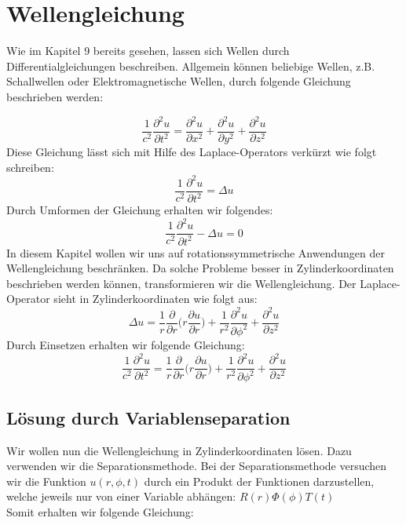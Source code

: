 \section{Wellengleichung}


Wie im Kapitel 9 bereits gesehen, lassen sich Wellen durch Differentialgleichungen beschreiben. Allgemein können beliebige Wellen, z.B. Schallwellen oder Elektromagnetische Wellen, durch folgende Gleichung beschrieben werden:

\begin{equation}
\frac{1}{c^2} \frac{\partial^2 u}{\partial t^2} = \frac{\partial^2 u}{\partial x^2} + \frac{\partial^2 u}{\partial y^2} + \frac{\partial^2 u}{\partial z^2}
\end{equation}
Diese Gleichung lässt sich mit Hilfe des Laplace-Operators verkürzt wie folgt schreiben:%
\begin{equation}
\frac{1}{c^2} \frac{\partial^2 u}{\partial t^2} = \Delta u
\end{equation}
Durch Umformen der Gleichung erhalten wir folgendes:
\begin{equation}
\frac{1}{c^2} \frac{\partial^2 u}{\partial t^2} - \Delta u = 0
\end{equation}
In diesem Kapitel wollen wir uns auf rotationssymmetrische Anwendungen der Wellengleichung beschränken. Da solche Probleme besser in Zylinderkoordinaten beschrieben werden können, transformieren wir die Wellengleichung. Der Laplace-Operator sieht in Zylinderkoordinaten wie folgt aus:
\begin{equation}
\Delta u = \frac{1}{r} \frac{\partial}{\partial r}\biggl(r \frac{\partial u}{\partial r}\biggr) + \frac{1}{r^2} \frac{\partial^2 u}{\partial \phi^2} + \frac{\partial^2 u}{\partial z^2} 
\end{equation} 
Durch Einsetzen erhalten wir folgende Gleichung:
\begin{equation}
\frac{1}{c^2} \frac{\partial^2 u}{\partial t^2} = \frac{1}{r} \frac{\partial}{\partial r}\biggl(r \frac{\partial u}{\partial r}\biggr) + \frac{1}{r^2} \frac{\partial^2 u}{\partial \phi^2} + \frac{\partial^2 u}{\partial z^2} 
\end{equation}

\subsection[Lösung durch Variablenseparation]{Lösung durch Variablenseparation}

Wir wollen nun die Wellengleichung in Zylinderkoordinaten lösen. Dazu verwenden wir die Separationsmethode.
Bei der Separationsmethode versuchen wir die Funktion $u(r, \phi, t)$ durch ein Produkt der Funktionen darzustellen, welche jeweils nur von einer Variable abhängen: $R(r)\Phi(\phi)T(t)$
\\Somit erhalten wir folgende Gleichung:


